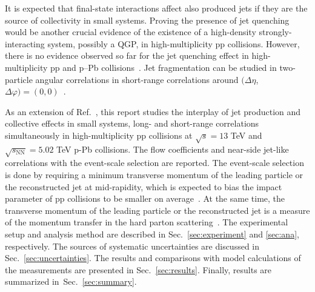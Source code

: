 It is expected that final-state interactions affect also produced jets if they are the source of collectivity in small systems. Proving the presence of jet quenching~\cite{Gyulassy:1990ye,Wang:1991xy} would be another crucial evidence of the existence of a high-density strongly-interacting system, possibly a QGP, in high-multiplicity pp collisions. However, there is no evidence observed so far for the jet quenching effect in high-multiplicity pp and p--Pb collisions~\cite{Khachatryan:2016odn,Adam:2016jfp,Adam:2016dau,Acharya:2017okq}. Jet fragmentation can be studied in two-particle angular correlations in short-range correlations around $(\Delta\eta$, $\Delta\varphi)=(0,0)$~\cite{Adam:2016tsv}.  

As an extension of Ref.~\cite{ALICE:2021nir}, this report studies the interplay of jet production and collective effects in small systems, long- and short-range correlations simultaneously in high-multiplicity pp collisions at $\sqrt{s} =13$ TeV and $\sqrt{s_{\mathrm{NN}}}=5.02$ TeV p-Pb collisions. 
The flow coefficients and near-side jet-like correlations with the event-scale selection are reported. The event-scale selection is done by requiring a minimum transverse momentum of the leading particle or the reconstructed jet at mid-rapidity, which is expected to bias the impact parameter of pp collisions to be smaller on average~\cite{Sjostrand:1986ep,Frankfurt:2010ea}. At the same time, the transverse momentum of the leading particle or the reconstructed jet is a measure of the momentum transfer in the hard parton scattering~\cite{Chatrchyan:2012tt,Chatrchyan:2011id}.
The experimental setup and analysis method are described in Sec.~\ref{sec:experiment} and \ref{sec:ana}, respectively. The sources of systematic uncertainties are discussed in Sec.~\ref{sec:uncertainties}. The results and comparisons with model calculations of the measurements are presented in Sec.~\ref{sec:results}. Finally, results are summarized in~Sec.~\ref{sec:summary}.

 